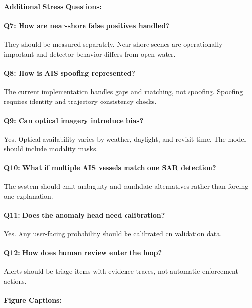 \documentclass{article}
\begin{document}
\paragraph{Additional Stress Questions:}

\paragraph{Q7: How are near-shore false positives handled?}
They should be measured separately. Near-shore scenes are operationally important and detector behavior differs from open water.

\paragraph{Q8: How is AIS spoofing represented?}
The current implementation handles gaps and matching, not spoofing. Spoofing requires identity and trajectory consistency checks.

\paragraph{Q9: Can optical imagery introduce bias?}
Yes. Optical availability varies by weather, daylight, and revisit time. The model should include modality masks.

\paragraph{Q10: What if multiple AIS vessels match one SAR detection?}
The system should emit ambiguity and candidate alternatives rather than forcing one explanation.

\paragraph{Q11: Does the anomaly head need calibration?}
Yes. Any user-facing probability should be calibrated on validation data.

\paragraph{Q12: How does human review enter the loop?}
Alerts should be triage items with evidence traces, not automatic enforcement actions.

\paragraph{Figure Captions:}
\end{document}
